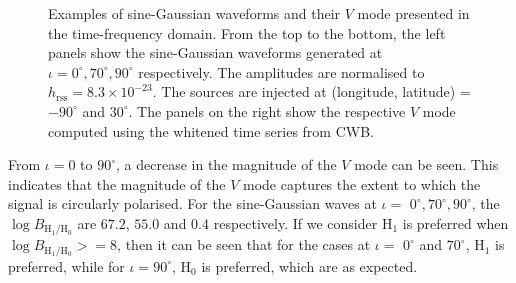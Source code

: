 \documentclass[aps,twocolumn,showpacs,groupedaddress, nofootinbib]{revtex4}  %
\begin{document}
\begin{figure}
\begin{center}
{        }\quad
    \end{center}
    \caption{Examples of sine-Gaussian waveforms and their $V$ mode presented in the time-frequency domain.
    From the top to the bottom, the left panels show the sine-Gaussian waveforms generated  at $\iota= 0^{\circ}, 70^{\circ}, 90^{\circ}$ respectively. 
    The amplitudes are normalised to  $h_\text{rss} = 8.3\times10^{-23}$.
    The sources are injected at  (longitude, latitude) = $-90^\circ$ and $30^\circ$.
    The panels on the right show the respective $V$ mode computed using the whitened time series from \ac{CWB}.
    \label{fig:simpleV}} 
\end{figure}
From $\iota = 0$ to  $90^{\circ}$, a decrease in the magnitude of the $V$ mode can be seen.
This indicates that the magnitude of the $V$ mode captures the extent to which the signal is circularly polarised.
For the sine-Gaussian waves at $\iota=$ $0^{\circ}, 70^{\circ}, 90^{\circ}$, the $\log {B_{\text{H}_1 / \text{H}_0}}$ 
are  $67.2$, $55.0$ and $0.4$ respectively.  
If we consider $\text{H}_1$ is preferred when $\log B_{\text{H}_1 / \text{H}_0}>= 8$, 
then it can be seen that for the cases at $\iota=$ $0^{\circ}$ and  $70^{\circ}$, $\text{H}_1$ is preferred, 
while for $\iota=90^{\circ}$, $\text{H}_0$ is preferred, which are as expected.
\end{document}
